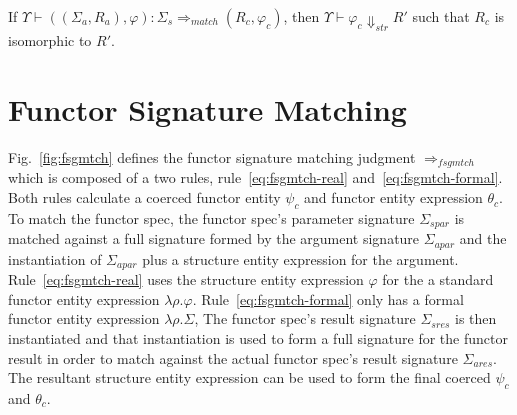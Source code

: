 \begin{lemma}
If $\Upsilon \vdash ((\Sigma_a,R_a),\varphi) : \Sigma_s
\Rightarrow_{match} (R_c,\varphi_c)$, then $\Upsilon\vdash \varphi_c
\Downarrow_{str} R'$ such that $R_c$ is isomorphic to $R'$. 
\end{lemma}

\section{Functor Signature Matching}



Fig.~\ref{fig:fsgmtch} defines the functor signature matching judgment
$\Rightarrow_{fsgmtch}$ which is composed of a two rules,
rule~\ref{eq:fsgmtch-real} and~\ref{eq:fsgmtch-formal}. Both rules calculate a coerced functor entity
$\psi_c$ and functor entity expression $\theta_c$. To match the
functor spec, the functor spec's parameter signature $\Sigma_{spar}$
is matched against a full signature formed by the argument 
signature $\Sigma_{apar}$ and the instantiation of $\Sigma_{apar}$
plus a structure entity expression for the
argument. Rule~\ref{eq:fsgmtch-real} uses the structure entity
expression $\varphi$ for the a standard functor entity expression
$\lambda\rho.\varphi$. Rule~\ref{eq:fsgmtch-formal} only has a formal
functor entity expression $\lambda\rho.\Sigma$, 
The functor spec's result signature $\Sigma_{sres}$ is then
instantiated and that instantiation is used to form a full signature
for the functor result in order to match against the actual functor
spec's result signature $\Sigma_{ares}$. The resultant structure
entity expression can be used to form the final coerced $\psi_c$ and
$\theta_c$.  





